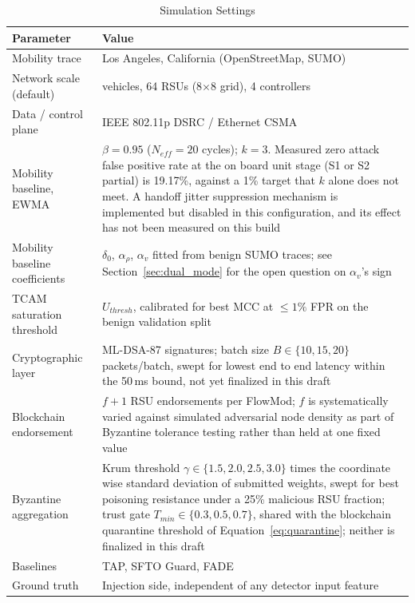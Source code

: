 \documentclass[final,5p,twocolumn]{elsarticle}
\theoremstyle{remark}
\theoremstyle{plain}
\begin{document}
\begin{table}[!t]
	\centering
	\caption{Simulation Settings}
	\label{tab:phantom_sim_settings}
	\renewcommand{\arraystretch}{1.2}
	\footnotesize
	\begin{tabular}{|>{\raggedright\arraybackslash}p{3.2cm}|>{\raggedright\arraybackslash}p{4.4cm}|}
		\hline
		\textbf{Parameter} & \textbf{Value} \\
		\hline
		Mobility trace & Los Angeles, California (OpenStreetMap, SUMO) \\
		\hline
		Network scale (default) & 200 vehicles, 64 RSUs (8$\times$8 grid), 4 controllers \\
		\hline
		Data / control plane & IEEE 802.11p DSRC / Ethernet CSMA \\
		\hline
		Mobility baseline, EWMA & $\beta = 0.95$ ($N_{eff}{=}20$ cycles); $k = 3$. Measured zero attack false positive rate at the on board unit stage (S1 or S2 partial) is 19.17\%, against a 1\% target that $k$ alone does not meet. A handoff jitter suppression mechanism is implemented but disabled in this configuration, and its effect has not been measured on this build \\
		\hline
		Mobility baseline coefficients & $\delta_0$, $\alpha_\rho$, $\alpha_v$ fitted from benign SUMO traces; see Section~\ref{sec:dual_mode} for the open question on $\alpha_v$'s sign \\
		\hline
		TCAM saturation threshold & $U_{thresh}$, calibrated for best MCC at $\leq 1\%$ FPR on the benign validation split \\
		\hline
		Cryptographic layer & ML-DSA-87 signatures; batch size $B \in \{10, 15, 20\}$ packets/batch, swept for lowest end to end latency within the 50\,ms bound, not yet finalized in this draft \\
		\hline
		Blockchain endorsement & $f{+}1$ RSU endorsements per FlowMod; $f$ is systematically varied against simulated adversarial node density as part of Byzantine tolerance testing rather than held at one fixed value \\
		\hline
		Byzantine aggregation & Krum threshold $\gamma \in \{1.5, 2.0, 2.5, 3.0\}$ times the coordinate wise standard deviation of submitted weights, swept for best poisoning resistance under a 25\% malicious RSU fraction; trust gate $T_{min} \in \{0.3, 0.5, 0.7\}$, shared with the blockchain quarantine threshold of Equation~\eqref{eq:quarantine}; neither is finalized in this draft \\
		\hline
		Baselines & TAP, SFTO Guard, FADE \\
		\hline
		Ground truth & Injection side, independent of any detector input feature \\
		\hline
	\end{tabular}
\end{table}
\end{document}
